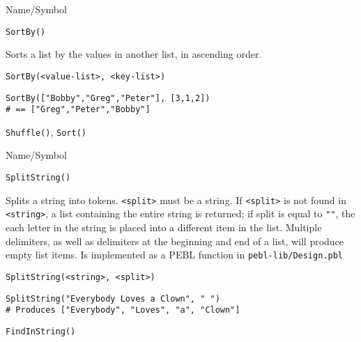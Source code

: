\rl


\begin{desc}{Name/Symbol}
\item[Name/Symbol] 	\verb+SortBy()+

\item[Description] 	Sorts a list by the values in another list, in ascending
		order.

\item[Usage]
\begin{verbatim}
SortBy(<value-list>, <key-list>)
\end{verbatim}

\item[Example]
\begin{verbatim}
SortBy(["Bobby","Greg","Peter"], [3,1,2]) 
# == ["Greg","Peter","Bobby"]
\end{verbatim}

\item[See Also]    	\verb+Shuffle()+, \verb+Sort()+
\end{desc}

\rl


\begin{desc}{Name/Symbol}
\item[Name/Symbol]  	\verb+SplitString()+

\item[Description]	Splits a string into tokens. \verb+<split>+ must be a string. If 
		\verb+<split>+ is not found in \verb+<string>+, a list containing the entire 
		string is returned; if split is equal to \verb+""+, the each letter 
		in the string is placed into a different item in the list.  
		Multiple delimiters, as well as delimiters at the beginning 
		and end of a list, will produce empty list items. 
		Is implemented as a PEBL function in \texttt{pebl-lib/Design.pbl}

\item[Usage]
\begin{verbatim}
SplitString(<string>, <split>)
\end{verbatim}

\item[Example]      	
\begin{verbatim}
SplitString("Everybody Loves a Clown", " ") 
# Produces ["Everybody", "Loves", "a", "Clown"]
\end{verbatim}

\item[See Also]     	\verb+FindInString()+
\end{desc}

